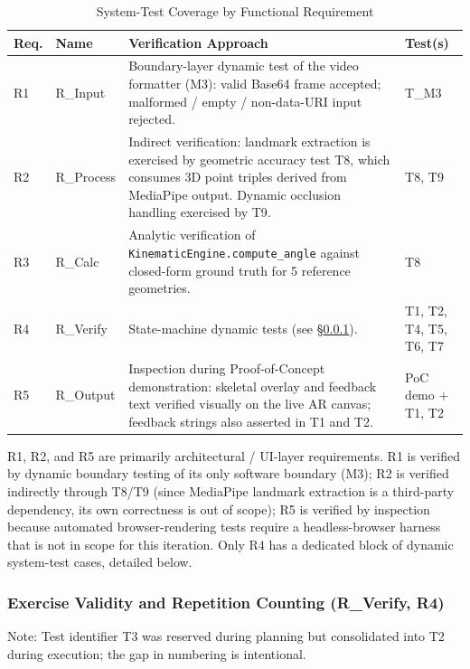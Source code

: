 \documentclass[12pt, titlepage]{article}
\begin{document}
\begin{table}[h!]
\centering
\begin{tabularx}{\textwidth}{l l X l}
\toprule
\textbf{Req.} & \textbf{Name} & \textbf{Verification Approach} & \textbf{Test(s)}\\
\midrule
R1 & R\_Input   & Boundary-layer dynamic test of the video formatter (M3): valid Base64 frame accepted; malformed / empty / non-data-URI input rejected. & T\_M3 \\
R2 & R\_Process & Indirect verification: landmark extraction is exercised by geometric accuracy test T8, which consumes 3D point triples derived from MediaPipe output. Dynamic occlusion handling exercised by T9. & T8, T9 \\
R3 & R\_Calc    & Analytic verification of \texttt{KinematicEngine.compute\_angle} against closed-form ground truth for 5 reference geometries. & T8 \\
R4 & R\_Verify  & State-machine dynamic tests (see \S\ref{subsub:r4}). & T1, T2, T4, T5, T6, T7 \\
R5 & R\_Output  & Inspection during Proof-of-Concept demonstration: skeletal overlay and feedback text verified visually on the live AR canvas; feedback strings also asserted in T1 and T2. & PoC demo + T1, T2 \\
\bottomrule
\end{tabularx}
\caption{System-Test Coverage by Functional Requirement}
\label{tab:sysfr}
\end{table}

R1, R2, and R5 are primarily architectural / UI-layer requirements. R1 is
verified by dynamic boundary testing of its only software boundary (M3);
R2 is verified indirectly through T8/T9 (since MediaPipe landmark extraction
is a third-party dependency, its own correctness is out of scope); R5 is
verified by inspection because automated browser-rendering tests require a
headless-browser harness that is not in scope for this iteration. Only R4
has a dedicated block of dynamic system-test cases, detailed below.

\subsubsection{Exercise Validity and Repetition Counting (R\_Verify, R4)}
\label{subsub:r4}

\noindent Note: Test identifier T3 was reserved during planning but consolidated
into T2 during execution; the gap in numbering is intentional.
\end{document}
